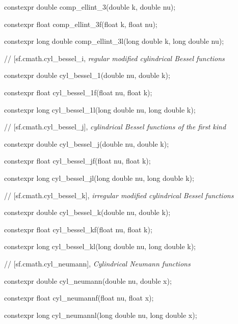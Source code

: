 \documentclass[prd,twocolumn,amsmath,amssymb,nofootinbib,eqsecnum]{revtex4-1}
\newcommand{\highlight}[1]{{\color{red} #1}}
\newcommand{\bigund}{{\Huge{\_}}}
\begin{document}
{\highlight{constexpr} double comp\_ellint\_3(double k, double nu);
	
\highlight{constexpr} float comp\_ellint\_3f(float k, float nu);
	
\highlight{constexpr} long double comp\_ellint\_3l(long double k, long double nu);

\vspace{2ex}
// [sf.cmath.cyl{\bigund}bessel{\bigund}i, {\it regular modified cylindrical Bessel functions}
\vspace{2ex}

\highlight{constexpr} double cyl\_bessel\_1(double nu, double k);
	
\highlight{constexpr} float cyl\_bessel\_1f(float nu, float k);
	
\highlight{constexpr} long cyl\_bessel\_1l(long double nu, long double k);

\vspace{2ex}
// [sf.cmath.cyl{\bigund}bessel{\bigund}j], {\it cylindrical Bessel functions of the first kind}
\vspace{2ex}

\highlight{constexpr} double cyl\_bessel\_j(double nu, double k);
	
\highlight{constexpr} float cyl\_bessel\_jf(float nu, float k);
	
\highlight{constexpr} long cyl\_bessel\_jl(long double nu, long double k);

\vspace{2ex}
// [sf.cmath.cyl{\bigund}bessel{\bigund}k], {\it irregular modified cylindrical Bessel functions}
\vspace{2ex}

\highlight{constexpr} double cyl\_bessel\_k(double nu, double k);
	
\highlight{constexpr} float cyl\_bessel\_kf(float nu, float k);
	
\highlight{constexpr} long cyl\_bessel\_kl(long double nu, long double k);

\vspace{2ex}
// [sf.cmath.cyl{\bigund}neumann], {\it Cylindrical Neumann functions}
\vspace{2ex}

\highlight{constexpr} double cyl\_neumann(double nu, double x);
	
\highlight{constexpr} float cyl\_neumannf(float nu, float x);
	
\highlight{constexpr} long cyl\_neumannl(long double nu, long double x);

}
\end{document}
